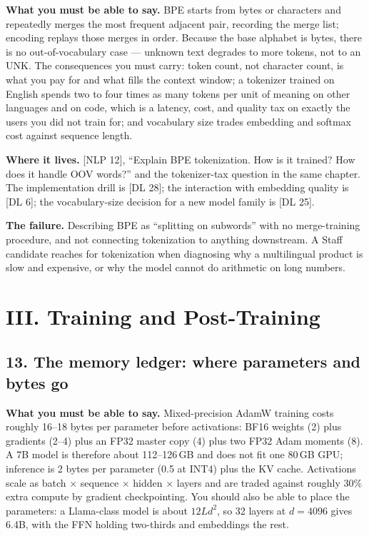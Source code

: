 \textbf{What you must be able to say.} BPE starts from bytes or characters and repeatedly merges the most frequent adjacent pair, recording the merge list; encoding replays those merges in order. Because the base alphabet is bytes, there is no out-of-vocabulary case --- unknown text degrades to more tokens, not to an UNK. The consequences you must carry: token count, not character count, is what you pay for and what fills the context window; a tokenizer trained on English spends two to four times as many tokens per unit of meaning on other languages and on code, which is a latency, cost, and quality tax on exactly the users you did not train for; and vocabulary size trades embedding and softmax cost against sequence length.

\textbf{Where it lives.} [NLP 12], ``Explain BPE tokenization. How is it trained? How does it handle OOV words?'' and the tokenizer-tax question in the same chapter. The implementation drill is [DL 28]; the interaction with embedding quality is [DL 6]; the vocabulary-size decision for a new model family is [DL 25].

\textbf{The failure.} Describing BPE as ``splitting on subwords'' with no merge-training procedure, and not connecting tokenization to anything downstream. A Staff candidate reaches for tokenization when diagnosing why a multilingual product is slow and expensive, or why the model cannot do arithmetic on long numbers.

\section*{III. Training and Post-Training}

\subsection*{13. The memory ledger: where parameters and bytes go}

\textbf{What you must be able to say.} Mixed-precision AdamW training costs roughly 16--18 bytes per parameter before activations: BF16 weights (2) plus gradients (2--4) plus an FP32 master copy (4) plus two FP32 Adam moments (8). A 7B model is therefore about 112--126\,GB and does not fit one 80\,GB GPU; inference is 2 bytes per parameter (0.5 at INT4) plus the KV cache. Activations scale as batch $\times$ sequence $\times$ hidden $\times$ layers and are traded against roughly 30\% extra compute by gradient checkpointing. You should also be able to place the parameters: a Llama-class model is about $12 L d^2$, so 32 layers at $d = 4096$ gives 6.4B, with the FFN holding two-thirds and embeddings the rest.

